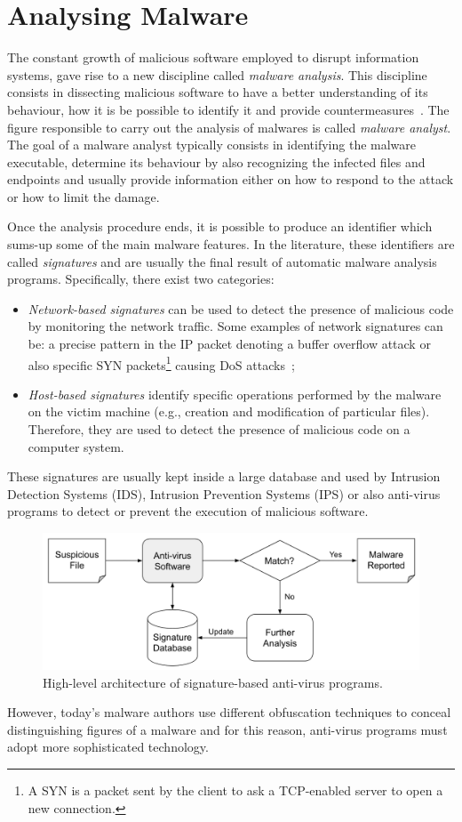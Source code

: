 \documentclass[LaM,binding=0.6cm]{sapthesis}
\begin{document}
\newpage
\section{Analysing Malware}
The constant growth of malicious software employed to disrupt information systems, gave rise to a new discipline called \textit{malware analysis}. This discipline consists in dissecting malicious software to have a better understanding of its behaviour, how it is be possible to identify it and provide countermeasures~\cite{sikorski2012practical}. The figure responsible to carry out the analysis of malwares is called \textit{malware analyst}. The goal of a malware analyst typically consists in identifying the malware executable, determine its behaviour by also recognizing the infected files and endpoints and usually provide information either on how to respond to the attack or how to limit the damage.

Once the analysis procedure ends, it is possible to produce an identifier which sums-up some of the main malware features. In the literature, these identifiers are called \textit{signatures} and are usually the final result of automatic malware analysis programs. Specifically, there exist two categories:
\begin{itemize}
\item \textit{Network-based signatures} can be used to detect the presence of malicious code by monitoring the network traffic. Some examples of network signatures can be: a precise pattern in the IP packet denoting a buffer overflow attack or also specific SYN packets\footnote{A SYN is a packet sent by the client to ask a TCP-enabled server to open a new connection.} causing DoS attacks~\cite{fuchsberger2005intrusion};
\item \textit{Host-based signatures} identify specific operations performed by the malware on the victim machine (e.g., creation and modification of particular files). Therefore, they are used to detect the presence of malicious code on a computer system.
\end{itemize}
These signatures are usually kept inside a large database and used by Intrusion Detection Systems (IDS), Intrusion Prevention Systems (IPS) or also anti-virus programs to detect or prevent the execution of malicious software. 
\begin{figure}[h!]
\centering
\includegraphics[scale=.5]{images/background2}
\caption{High-level architecture of signature-based anti-virus programs.}
\end{figure}
\newpage
However, today's malware authors use different obfuscation techniques to conceal distinguishing figures of a malware and for this reason, anti-virus programs must adopt more 
sophisticated technology.\\
\end{document}
